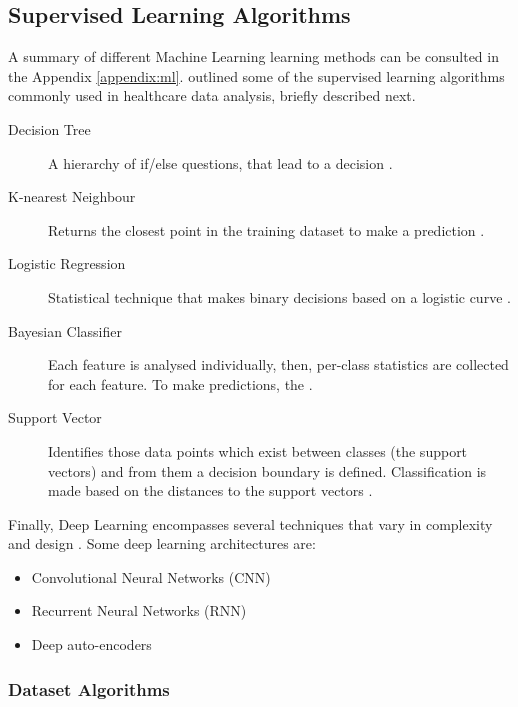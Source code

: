 \documentclass[a4paper,11pt]{article}
\begin{document}
\subsection{Supervised Learning Algorithms}

A summary of different Machine Learning learning methods can be consulted in the
Appendix \ref{appendix:ml}.
\textcite{Jothi2015} outlined some of the supervised learning algorithms
commonly used in healthcare data analysis, briefly described next.

\begin{description}
    \item[Decision Tree] A hierarchy of if/else questions, that lead to a decision \parencite{Mueller2017}.
    \item[K-nearest Neighbour] Returns the closest point in the training dataset
    to make a prediction \parencite{Mueller2017}.
    \item[Logistic Regression] Statistical technique that makes binary decisions
    based on a logistic curve \parencite{Nick2007}.
    \item[Bayesian Classifier] Each feature is analysed individually, then,
    per-class statistics are collected for each feature. 
    To make predictions, the .
    \item[Support Vector] Identifies those data points which exist between classes
    (the support vectors) and from them a decision boundary is defined.
    Classification is made based on the distances to the support vectors \parencite[98]{Mueller2017}.
\end{description}


Finally, Deep Learning encompasses several techniques that vary in complexity and design \parencite{Ibrahim2021}.
Some deep learning architectures are:

\begin{itemize}
 \item Convolutional Neural Networks (CNN)
 \item Recurrent Neural Networks (RNN)
 \item Deep auto-encoders
\end{itemize}

\subsubsection{Dataset Algorithms}
\end{document}
